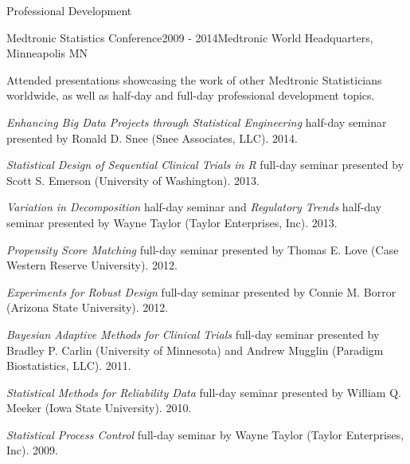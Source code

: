\documentclass{resume} %
\begin{document}
\begin{rSection}{Professional Development}
		
	\begin{rSubsection}{Medtronic Statistics Conference}{2009 - 2014}{Medtronic World Headquarters, Minneapolis MN}{}
		\item[] Attended presentations showcasing the work of other Medtronic Statisticians worldwide, as well as half-day and full-day professional development topics. \vspace{0.5em}  
		\item[] \textit{Enhancing Big Data Projects through Statistical Engineering} half-day seminar presented by Ronald D. Snee (Snee Associates, LLC). 2014. \vspace{0.5em}  
		\item[] \textit{Statistical Design of Sequential Clinical Trials in R} full-day seminar presented by Scott S. Emerson (University of Washington). 2013.\vspace{0.5em}  
		\item[] \textit{Variation in Decomposition} half-day seminar and \textit{Regulatory Trends} half-day seminar presented by Wayne Taylor (Taylor Enterprises, Inc). 2013.\vspace{0.5em}  
		\item[] \textit{Propensity Score Matching} full-day seminar presented by Thomas E. Love (Case Western Reserve University). 2012.\vspace{0.5em}  
		\item[] \textit{Experiments for Robust Design} full-day seminar presented by Connie M. Borror (Arizona State University). 2012.\vspace{0.5em}  
		\item[] \textit{Bayesian Adaptive Methods for Clinical Trials} full-day seminar presented by Bradley P. Carlin (University of Minnesota) and Andrew Mugglin (Paradigm Biostatistics, LLC). 2011.\vspace{0.5em}  
		\item[] \textit{Statistical Methods for Reliability Data} full-day seminar presented by William Q. Meeker (Iowa State University). 2010.\vspace{0.5em}  
		\item[] \textit{Statistical Process Control} full-day seminar by Wayne Taylor (Taylor Enterprises, Inc). 2009.\vspace{0.5em}  
		
		
	\end{rSubsection}
		
		
\end{rSection}
\end{document}
